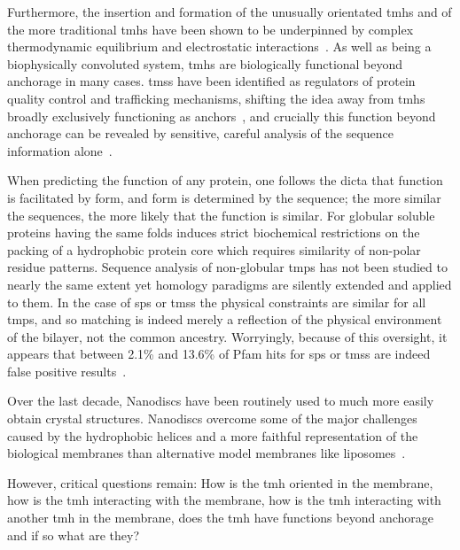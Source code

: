 Furthermore, the insertion and formation of the unusually orientated \gls{tmh}s and of the more traditional \gls{tmh}s have been shown to be underpinned by complex thermodynamic equilibrium and electrostatic interactions~\cite{Cymer2015, Elisa2012, Ismail2015}.
As well as being a biophysically convoluted system, \gls{tmh}s are biologically functional beyond anchorage in many cases.
\gls{tms}s have been identified as regulators of protein quality control and trafficking mechanisms, shifting the idea away from \gls{tmh}s broadly exclusively functioning as anchors~\cite{Hessa2011}, and crucially this function beyond anchorage can be revealed by sensitive, careful analysis of the sequence information alone~\cite{Wong2012}.

When predicting the function of any protein, one follows the dicta that function is facilitated by form, and form is determined by the sequence; the more similar the sequences, the more likely that the function is similar.
For globular soluble proteins having the same folds induces strict biochemical restrictions on the packing of a hydrophobic protein core which requires similarity of non-polar residue patterns.
Sequence analysis of non-globular \gls{tmp}s has not been studied to nearly the same extent yet homology paradigms are silently extended and applied to them.
In the case of \gls{sp}s or \gls{tms}s the physical constraints are similar for all \gls{tmp}s, and so matching is indeed merely a reflection of the physical environment of the bilayer, not the common ancestry.
Worryingly, because of this oversight, it appears that between 2.1\% and 13.6\% of Pfam hits for \gls{sp}s or \gls{tms}s are indeed false positive results~\cite{Wong2010}.



 Over the last decade, Nanodiscs have been routinely used to much more easily obtain crystal structures.
Nanodiscs overcome some of the major challenges caused by the hydrophobic helices and a more faithful representation of the biological membranes than alternative model membranes like liposomes~\cite{Borch2009}.

 However, critical questions remain: How is the \gls{tmh} oriented in the membrane, how is the \gls{tmh} interacting with the membrane, how is the \gls{tmh} interacting with another \gls{tmh} in the membrane, does the \gls{tmh} have functions beyond anchorage and if so what are they?


